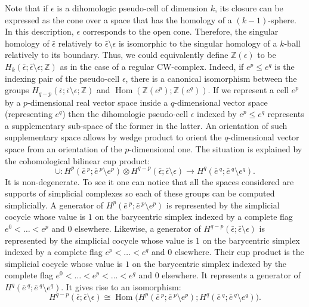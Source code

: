 \documentclass[10pt]{amsart}
\theoremstyle{definition}
\numberwithin{equation}{section}
\numberwithin{figure}{section}
\newcommand{\Z}{\mathbb{Z}}
\DeclareMathOperator{\Hom}{Hom}
\begin{document}
Note that if $\epsilon$ is a dihomologic pseudo-cell of dimension $k$, its closure can be expressed as the cone over a space that has the homology of a $(k-1)$-sphere. In this description, $\epsilon$ corresponds to the open cone. Therefore, the singular homology of $\bar{\epsilon}$ relatively to $\bar{\epsilon}\setminus\epsilon$ is isomorphic to the singular homology of a $k$-ball relatively to its boundary. Thus, we could equivalently define $\Z(\epsilon)$ to be $H_k(\bar{\epsilon};\bar{\epsilon}\setminus\epsilon;\Z)$ as in the case of a regular CW-complex. Indeed, if $e^p\leq e^q$ is the indexing pair of the pseudo-cell $\epsilon$, there is a canonical isomorphism between the groups $H_{q-p}(\bar{\epsilon};\bar{\epsilon}\setminus\epsilon;\Z)$ and $\Hom(\Z(e^p);\Z(e^q))$. If we represent a cell $e^p$ by a $p$-dimensional real vector space inside a $q$-dimensional vector space (representing $e^q$) then the dihomologic pseudo-cell $\epsilon$ indexed by $e^p\leq e^q$ represents a supplementary sub-space of the former in the latter. An orientation of such supplementary space allows by wedge product to orient the $q$-dimensional vector space from an orientation of the $p$-dimensional one. The situation is explained by the cohomological bilinear cup product:
\begin{equation*}
\cup : H^p\left(\bar{e}\,^p;\bar{e}\,^p\setminus e^p\right)\otimes H^{q-p}\left(\bar{\epsilon};\bar{\epsilon}\setminus\epsilon\right) \rightarrow H^q\left(\bar{e}\,^q;\bar{e}\,^q\setminus e^q\right).
\end{equation*}
It is non-degenerate. To see it one can notice that all the spaces considered are supports of simplicial complexes so each of these groups can be computed simplicially. A generator of $H^p(\bar{e}\,^p;\bar{e}\,^p\setminus e^p)$ is represented by the simplicial cocycle whose value is $1$ on the barycentric simplex indexed by a complete flag $e^0<\dots<e^p$ and $0$ elsewhere. Likewise, a generator of $H^{q-p}(\bar{\epsilon};\bar{\epsilon}\setminus\epsilon)$ is represented by the simplicial cocycle whose value is $1$ on the barycentric simplex indexed by a complete flag $e^p<\dots<e^q$ and $0$ elsewhere. Their cup product is the simplicial cocycle whose value is $1$ on the barycentric simplex indexed by the complete flag $e^0<\dots<e^p<\dots<e^q$ and $0$ elsewhere. It represents a generator of $H^q(\bar{e}\,^q;\bar{e}\,^q\setminus e^q)$. It gives rise to an isomorphism:
\begin{equation*}
H^{q-p}(\bar{\epsilon};\bar{\epsilon}\setminus\epsilon)\cong \Hom\Big(H^p\left(\bar{e}\,^p;\bar{e}\,^p\setminus e^p\right);H^q\left(\bar{e}\,^q;\bar{e}\,^q\setminus e^q\right)\Big).
\end{equation*}
\end{document}

